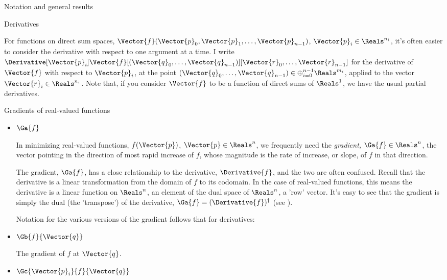 \begin{plSection}{Notation and general results}
\begin{plSection}{Derivatives}
\begin{itemize}
For functions on direct sum spaces,
$\Vector{f}(\Vector{p}_0,\Vector{p}_1,\ldots,
\Vector{p}_{n-1})$, 
$\Vector{p}_i \in \Reals^{n_i}$,
it's often easier to consider the derivative
with respect to one argument at a time.
I write 
$\Derivative[\Vector{p}_i]{\Vector{f}}
[(\Vector{q}_0,\ldots,\Vector{q}_{n-1})]
[\Vector{r}_0,\ldots,\Vector{r}_{n-1}]$
for the derivative of $\Vector{f}$ with respect to $\Vector{p}_i$,
at the point 
$(\Vector{q}_0,\ldots,\Vector{q}_{n-1})
 \in \oplus_{i=0}^{n-1} \Reals^{m_i}$,
applied to the vector $\Vector{r}_i \in \Reals^{n_i}$.
Note that, if you consider $\Vector{f}$ to be a function
of direct sums of $\Reals^1$, we have the usual
partial derivatives.

\end{itemize}

\begin{plSection}{Gradients of real-valued functions}
\label{sec:gradients}

\begin{itemize}

\item $\Ga{f}$

In minimizing real-valued functions, $f(\Vector{p})$, $\Vector{p} \in \Reals^n$,
we frequently need
the {\it gradient,} $\Ga{f} \in \Reals^n$,
the vector pointing in the direction of most rapid increase of $f$,
whose magnitude is the rate of increase, or slope,
of $f$ in that direction.

The gradient, $\Ga{f}$,
has a close relationship to the derivative, $\Derivative{f}$,
and the two are often confused.
Recall that the derivative is a linear transformation
from the domain of $f$ to its codomain.
In the case of real-valued functions,
this means the derivative is a linear function on $\Reals^n$,
an element of the dual space of $\Reals^n$, a 'row' vector.
It's easy to see that the gradient is simply the dual (the 'transpose')
of the derivative, $\Ga{f} = (\Derivative{f})^{\dagger}$
(see ).

Notation for the various versions of the gradient
follows that for derivatives:

\item $\Gb{f}{\Vector{q}}$

The gradient of $f$ at $\Vector{q}$.

\item $\Gc{\Vector{p}_i}{f}{\Vector{q}}$


\end{itemize}
\end{plSection}
\end{plSection}
\end{plSection}
